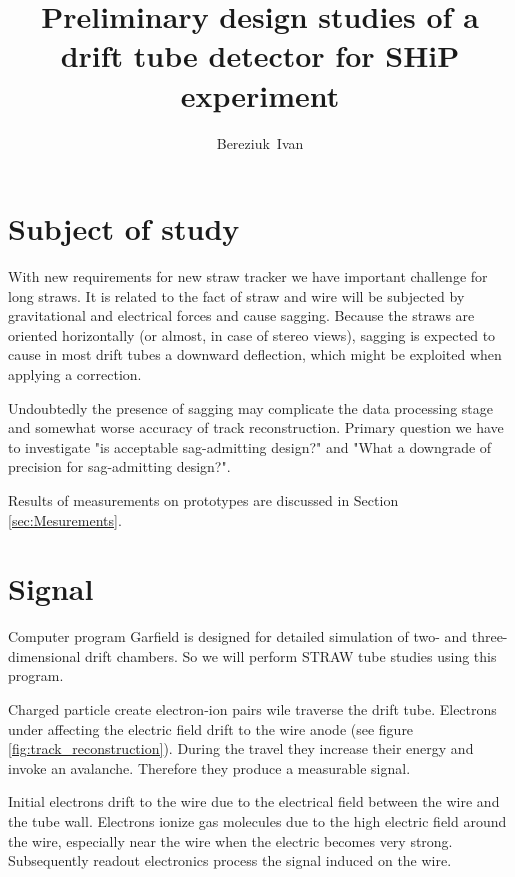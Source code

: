 \documentclass[12pt,a4paper]{article}
\author{Bereziuk~Ivan}
\title{ Preliminary design studies of a drift tube detector for SHiP experiment }
\begin{document}
	 \linenumbers
	\maketitle
	\newpage
	
		
	 

 \section{Subject of study}
	
	With new requirements for new straw tracker we have important challenge for long straws. It is related to the fact of straw and wire will be subjected by gravitational and electrical forces and cause sagging. Because the straws are oriented horizontally (or almost, in case of stereo views), sagging is expected to cause in most drift tubes a downward deflection, which might be exploited
when applying a correction.

	Undoubtedly the presence of sagging may complicate the data processing stage and somewhat worse accuracy of track reconstruction. Primary question we have to investigate "is acceptable sag-admitting design?" and "What a downgrade of precision for sag-admitting design?".
	
	Results of measurements on prototypes are discussed in Section \ref{sec:Mesurements}.
	
	
	\section{Signal}	
	Computer program Garfield \cite{garfield} is designed for detailed simulation of two- and three-dimensional drift chambers. So we will perform STRAW tube studies using this program.
	
	Charged particle  create electron-ion pairs wile traverse the drift tube. Electrons under affecting the electric field drift to the wire anode (see figure \ref{fig:track_reconstruction}). During the travel they increase their energy and invoke an avalanche. Therefore they produce a measurable signal.

	Initial electrons drift to the wire due to the electrical field between the wire and the tube wall. Electrons ionize gas molecules due to the high electric field around the wire, especially near the wire when the electric becomes very strong.  Subsequently readout electronics process the signal induced on the wire.
	  
\end{document}
